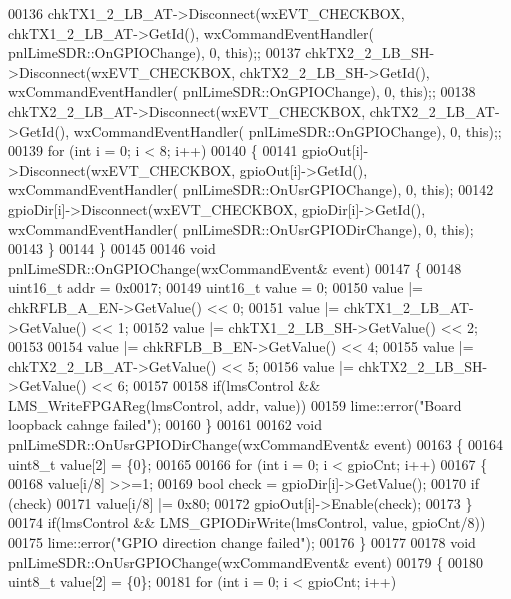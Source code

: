 \begin{DoxyCode}
{00136     chkTX1\_2\_LB\_AT->Disconnect(wxEVT\_CHECKBOX, chkTX1\_2\_LB\_AT->GetId(), wxCommandEventHandler(
      pnlLimeSDR::OnGPIOChange), 0, \textcolor{keyword}{this});;
00137     chkTX2\_2\_LB\_SH->Disconnect(wxEVT\_CHECKBOX, chkTX2\_2\_LB\_SH->GetId(), wxCommandEventHandler(
      pnlLimeSDR::OnGPIOChange), 0, \textcolor{keyword}{this});;
00138     chkTX2\_2\_LB\_AT->Disconnect(wxEVT\_CHECKBOX, chkTX2\_2\_LB\_AT->GetId(), wxCommandEventHandler(
      pnlLimeSDR::OnGPIOChange), 0, \textcolor{keyword}{this});;
00139     \textcolor{keywordflow}{for} (\textcolor{keywordtype}{int} i = 0; i < 8; i++)
00140     \{
00141         gpioOut[i]->Disconnect(wxEVT\_CHECKBOX, gpioOut[i]->GetId(), wxCommandEventHandler(
      pnlLimeSDR::OnUsrGPIOChange), 0, \textcolor{keyword}{this});
00142         gpioDir[i]->Disconnect(wxEVT\_CHECKBOX, gpioDir[i]->GetId(), wxCommandEventHandler(
      pnlLimeSDR::OnUsrGPIODirChange), 0, \textcolor{keyword}{this});
00143     \}
00144 \}
00145 
00146 \textcolor{keywordtype}{void} pnlLimeSDR::OnGPIOChange(wxCommandEvent& event)
00147 \{
00148     uint16\_t addr = 0x0017;
00149     uint16\_t value = 0;
00150     value |= chkRFLB\_A\_EN->GetValue() << 0;
00151     value |= chkTX1\_2\_LB\_AT->GetValue() << 1;
00152     value |= chkTX1\_2\_LB\_SH->GetValue() << 2;
00153 
00154     value |= chkRFLB\_B\_EN->GetValue() << 4;
00155     value |= chkTX2\_2\_LB\_AT->GetValue() << 5;
00156     value |= chkTX2\_2\_LB\_SH->GetValue() << 6;
00157 
00158     \textcolor{keywordflow}{if}(lmsControl && LMS_WriteFPGAReg(lmsControl, addr, value))
00159     lime::error(\textcolor{stringliteral}{"Board loopback cahnge failed"});
00160 \}
00161 
00162 \textcolor{keywordtype}{void} pnlLimeSDR::OnUsrGPIODirChange(wxCommandEvent& event)
00163 \{
00164     uint8\_t value[2] = \{0\};
00165 
00166     \textcolor{keywordflow}{for} (\textcolor{keywordtype}{int} i = 0; i < gpioCnt; i++)
00167     \{
00168         value[i/8] >>=1;
00169         \textcolor{keywordtype}{bool} check = gpioDir[i]->GetValue();
00170         \textcolor{keywordflow}{if} (check)
00171             value[i/8] |= 0x80;
00172         gpioOut[i]->Enable(check);
00173     \}
00174     \textcolor{keywordflow}{if}(lmsControl && LMS_GPIODirWrite(lmsControl, value, gpioCnt/8))
00175         lime::error(\textcolor{stringliteral}{"GPIO direction change failed"});
00176 \}
00177 
00178 \textcolor{keywordtype}{void} pnlLimeSDR::OnUsrGPIOChange(wxCommandEvent& event)
00179 \{
00180     uint8\_t value[2] = \{0\};
00181     \textcolor{keywordflow}{for} (\textcolor{keywordtype}{int} i = 0; i < gpioCnt; i++)
}
\end{DoxyCode}
